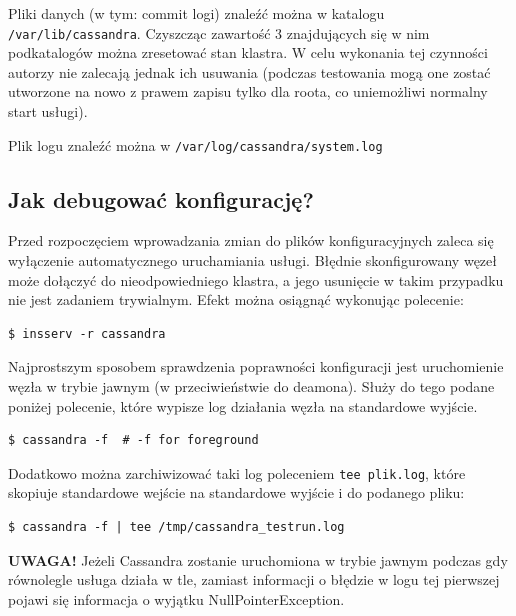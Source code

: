 \documentclass{article}
\begin{document}
Pliki danych (w tym: commit logi) znaleźć można w katalogu \lstinline[style=bash]!/var/lib/cassandra!. Czyszcząc zawartość 3 znajdujących się w nim podkatalogów można zresetować stan klastra. W celu wykonania tej czynności autorzy nie zalecają jednak ich usuwania (podczas testowania mogą one zostać utworzone na nowo z prawem zapisu tylko dla roota, co uniemożliwi normalny start usługi).

Plik logu znaleźć można w \lstinline[style=bash]!/var/log/cassandra/system.log!

\subsection{Jak debugować konfigurację?}

Przed rozpoczęciem wprowadzania zmian do plików konfiguracyjnych zaleca się wyłączenie automatycznego uruchamiania usługi. Błędnie skonfigurowany węzeł może dołączyć do nieodpowiedniego klastra, a jego usunięcie w takim przypadku nie jest zadaniem trywialnym. Efekt można osiągnąć wykonując polecenie:

\begin{lstlisting}[style=bash, caption={wyłączenie uruchamiania Cassandry na jej domyślnych runlevelach}]
$ insserv -r cassandra
\end{lstlisting}

Najprostszym sposobem sprawdzenia poprawności konfiguracji jest uruchomienie węzła w trybie jawnym (w przeciwieństwie do deamona). Służy do tego podane poniżej polecenie, które wypisze log działania węzła na standardowe wyjście.

\begin{lstlisting}[style=bash, caption={wyłączenie uruchamiania Cassandry na jej domyślnych runlevelach}]
$ cassandra -f  # -f for foreground
\end{lstlisting}

Dodatkowo można zarchiwizować taki log poleceniem \lstinline[style=bash]!tee plik.log!, które skopiuje standardowe wejście na standardowe wyjście i do podanego pliku:

\begin{lstlisting}[style=bash, caption={wyłączenie uruchamiania Cassandry na jej domyślnych runlevelach}]
$ cassandra -f | tee /tmp/cassandra_testrun.log
\end{lstlisting}

\textbf{UWAGA!} Jeżeli Cassandra zostanie uruchomiona w trybie jawnym podczas gdy równolegle usługa działa w tle, zamiast informacji o błędzie w logu tej pierwszej pojawi się informacja o wyjątku NullPointerException.
\end{document}
